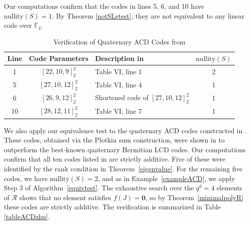 \documentclass[a4paper,12pt]{article}
\theoremstyle{plain}
\theoremstyle{definition}
\begin{document}
Our computations confirm that the codes in lines 5, 6, and 10 have $\text{nullity}(S)=1$. By Theorem \ref{notSLetest},  they are not equivalent to any linear code over $\mathbb{F}_4$.

 
\begin{table}[H]
\centering
\caption{Verification of Quaternary ACD Codes from \cite[Table IV]{guan2023}}
\renewcommand{\arraystretch}{1.4}
\begin{tabular}{|c|c|p{4cm}|c|}
\hline
\textbf{Line} & \textbf{Code Parameters} & \textbf{Description in \cite{guan2023}} & $\mathrm{nullity}(S)$ \\ \hline
1 & $[22, 10, 9]^2_2$ & Table VI, line 1 & 2 \\ \hline
5 & $[27,10,12]^2_2$  & Table VI, line 4 & 1 \\ \hline
6 & $[26,9,12]^2_2$  & Shortened code of $[27,10,12]^2_2$  & 1 \\ \hline
10 & $[28,12,11]^2_2$   & Table VI, line 7 & 1 \\ \hline
\end{tabular}
\label{tableacd_verification}
\end{table}






We also apply our equivalence test to the quaternary ACD codes constructed in \cite{zhu2024}. 
These codes, obtained via the Plotkin sum construction, were shown in \cite{zhu2024} to outperform the best-known quaternary Hermitian LCD codes. 
Our computations confirm that all ten codes listed in \cite[Table 2]{zhu2024} are strictly additive. 
Five of these were identified by the rank condition in Theorem~\ref{eigenvalue}.
For the remaining five codes, we have $\mathrm{nullity}(S) = 2$, and  as in 
Example~\ref{exampleACD}, we apply Step 3 of Algorithm~\ref{equivtest}. 
The  exhaustive search over the $q^d = 4$ elements of $\mathcal{R}$ shows that no 
element satisfies $f(J) = \mathbf{0}$, so by Theorem~\ref{minimalpolyR} these 
codes are strictly additive.
The verification is summarized in Table \ref{tableACDzhu}. 
\end{document}
